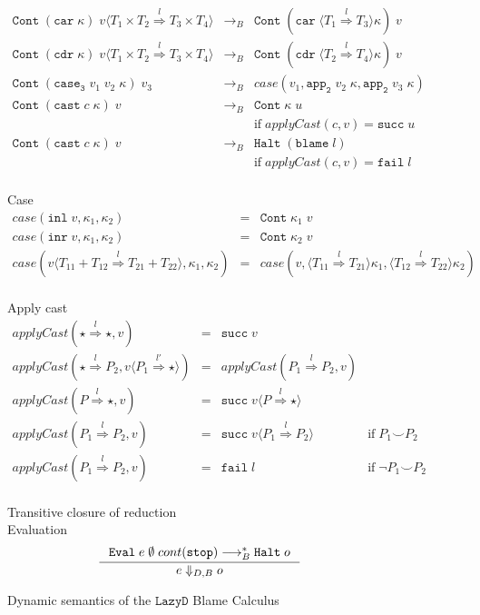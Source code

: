 \documentclass[acmsmall,review,anonymous]{acmart}\settopmatter{printfolios=true,printccs=false,printacmref=false}
\newcommand{\funrule}[3]{#1 &=& #2 & #3\\}
\newcommand{\redrule}[3]{#1 & \longrightarrow_B & #2 & #3\\}
\newcommand{\plus}[0]{+}
\newcommand{\lazyD}{$\mathtt{Lazy D}$}
\newcommand{\sOOinspect}[3]{\mathtt{Eval} \; #1 \; #2 \; #3}
\newcommand{\sOOreturn}[2]{\mathtt{Cont} \; #2 \; #1}
\newcommand{\sOOhalt}[1]{\mathtt{Halt} \; #1}
\newcommand{\POOprod}[2]{#1 \times #2}
\newcommand{\POOsum}[2]{#1 \plus #2}
\newcommand{\oOOblame}[1]{\mathtt{blame} \; #1}
\newcommand{\cOOcast}[3]{#1 \overset{#2}{\Rightarrow} #3}
\newcommand{\vOOcast}[2]{#1\langle#2\rangle}
\newcommand{\vOOfun}[3]{\mathtt{fun} \; #1 \; #2 \; #3}
\newcommand{\vOOinl}[1]{\mathtt{inl}\;#1}
\newcommand{\vOOinr}[1]{\mathtt{inr}\;#1}
\newcommand{\rOOsucc}[1]{\mathtt{succ}\;#1}
\newcommand{\rOOfail}[1]{\mathtt{fail}\;#1}
\newcommand{\hckOOmt}[0]{\mathtt{stop}}
\newcommand{\sidecond}[1]{\text{if}\;#1}
\begin{document}
\begin{figure}
\[\begin{array}{rclr}

	\redrule{
		\sOOreturn{
			\vOOcast{v}{\cOOcast{\POOprod{T_1}{T_2}}{l}{
					\POOprod{T_3}{T_4}}}
			}{(\mathtt{car} \; \kappa)}
	}{
		\sOOreturn{v}{(
			\mathtt{car} \;
			\langle \cOOcast{T_1}{l}{T_3} \rangle \kappa
			)}
	}{}

	\redrule{
		\sOOreturn{
			\vOOcast{v}{\cOOcast{\POOprod{T_1}{T_2}}{l}{
					\POOprod{T_3}{T_4}}}
		}{(\mathtt{cdr} \; \kappa)}
	}{
		\sOOreturn{v}{(
			\mathtt{cdr} \;
			\langle \cOOcast{T_2}{l}{T_4} \rangle \kappa
			)}
	}{}

	\redrule{
		\sOOreturn{v_3}{(
			\mathtt{case_3} \;
			v_1 \; v_2 \;
			\kappa
		)}
	}{case(v_1,
	\mathtt{app_2} \; v_2 \; \kappa,
	\mathtt{app_2} \; v_3 \; \kappa
	)}{}

	\redrule{
		\sOOreturn{v}{(
			\mathtt{cast} \; c \; \kappa
		)}
	}{
		\sOOreturn{u}{\kappa}
		\\ &
	}{
		\sidecond{applyCast(c,v) = \rOOsucc{u}}
	}

	\redrule{
		\sOOreturn{v}{(
			\mathtt{cast} \; c \; \kappa
			)}
	}{
		\sOOhalt{(\oOOblame{l})}
		\\ &
	}{
		\sidecond{applyCast(c,v) = \rOOfail{l}}
	}
	\end{array}
	\]	
	
	Case
	\[
	\begin{array}{rclr}
	\funrule{case(\vOOinl{v},\kappa_1,\kappa_2)}{
		\sOOreturn{v}{\kappa_1}
	}{}
	\funrule{case(\vOOinr{v},\kappa_1,\kappa_2)}{
		\sOOreturn{v}{\kappa_2}
	}{}
	\funrule{case(\vOOcast{v}{\cOOcast{\POOsum{T_{11}}{T_{12}}}{l}{\POOsum{T_{21}}{T_{22}}}},\kappa_1,\kappa_2)}{
		case(v,
		\langle \cOOcast{T_{11}}{l}{T_{21}} \rangle \kappa_1,
		\langle \cOOcast{T_{12}}{l}{T_{22}} \rangle \kappa_2)
	}{}
	\end{array}
	\]
	
	Apply cast
	\[
	\begin{array}{rclr}
	\funrule{
		applyCast(\cOOcast{\star}{l}{\star},v)
	}{
		\rOOsucc{v}
	}{}
	\funrule{
		applyCast(\cOOcast{\star}{l}{P_2},\vOOcast{v}{\cOOcast{P_1}{l'}{\star}})
	}{
		applyCast(\cOOcast{P_1}{l}{P_2},v)
	}{}
	\funrule{
		applyCast(\cOOcast{P}{l}{\star},v)
	}{
		\rOOsucc{\vOOcast{v}{\cOOcast{P}{l}{\star}}}
	}{}
	\funrule{
		applyCast(\cOOcast{P_1}{l}{P_2},v)
	}{
		\rOOsucc{\vOOcast{v}{\cOOcast{P_1}{l}{P_2}}}
	}{\sidecond{P_1 \smile P_2}}
	\funrule{
		applyCast(\cOOcast{P_1}{l}{P_2},v)
	}{
		\rOOfail{l}
	}{\sidecond{\neg P_1 \smile P_2}}
	
	\end{array}
	\]
	
	Transitive closure of reduction \\
	
	Evaluation 
	\[
	\inference{
		\sOOinspect{e}{\emptyset}{cont(\hckOOmt)} \longrightarrow_{B}^{*} 
		\sOOhalt{o}
	}{
		e \Downarrow_{D,B} o
	}
	\]
	
	\caption{Dynamic semantics of the \lazyD{} Blame Calculus}
	\label{machine-cekc}
\end{figure}
\end{document}
